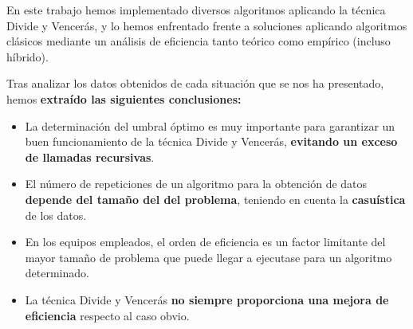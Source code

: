 En este trabajo hemos implementado diversos algoritmos aplicando
la técnica Divide y Vencerás, y lo hemos enfrentado frente a soluciones aplicando
algoritmos clásicos mediante un análisis de eficiencia tanto teórico como empírico 
(incluso híbrido). 

Tras analizar los datos obtenidos de cada situación que se nos ha presentado,
hemos \textbf{extraído las siguientes conclusiones: }

\begin{itemize}
    \item La determinación del umbral óptimo es muy importante para garantizar un buen funcionamiento
    de la técnica Divide y Vencerás, \textbf{evitando un exceso de llamadas recursivas}.
    \item El número de repeticiones de un algoritmo para la obtención de datos \textbf{depende del tamaño del 
    del problema}, teniendo en cuenta la \textbf{casuística} de los datos.  
    \item En los equipos empleados, el orden de eficiencia es un factor limitante del mayor tamaño de 
    problema que puede llegar a ejecutase para un algoritmo determinado.
    \item La técnica Divide y Vencerás \textbf{no siempre proporciona una mejora de eficiencia}
    respecto al caso obvio. 
    
\end{itemize}